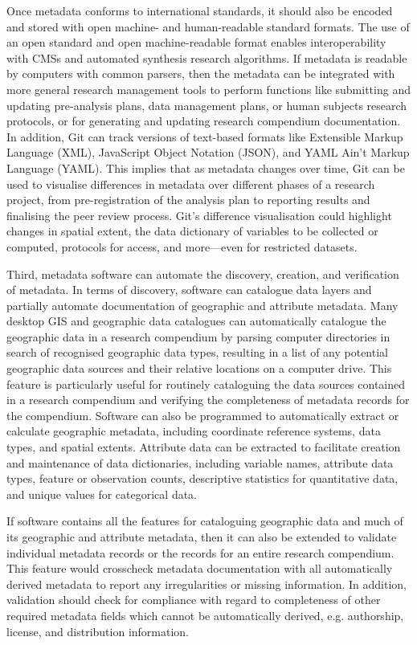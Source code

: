 \documentclass{isprs} %
\begin{document}
Once metadata conforms to international standards, it should also be encoded and stored with open machine- and human-readable standard formats. 
The use of an open standard and open machine-readable format enables interoperability with CMSs and automated synthesis research algorithms.
If metadata is readable by computers with common parsers, then the metadata can be integrated with more general research management tools to perform functions like submitting and updating pre-analysis plans, data management plans, or human subjects research protocols, or for generating and updating research compendium documentation.
In addition, Git can track versions of text-based formats like Extensible Markup Language (XML), JavaScript Object Notation (JSON), and YAML Ain't Markup Language (YAML).
This implies that as metadata changes over time, Git can be used to visualise differences in metadata over different phases of a research project, from pre-registration of the analysis plan to reporting results and finalising the peer review process.
Git's difference visualisation could highlight changes in spatial extent, the data dictionary of variables to be collected or computed, protocols for access, and more---even for restricted datasets.

Third, metadata software can automate the discovery, creation, and verification of metadata.
In terms of discovery, software can catalogue data layers and partially automate documentation of geographic and attribute metadata.
Many desktop GIS and geographic data catalogues can automatically catalogue the geographic data in a research compendium by parsing computer directories in search of recognised geographic data types, resulting in a list of any potential geographic data sources and their relative locations on a computer drive.
This feature is particularly useful for routinely cataloguing the data sources contained in a research compendium and verifying the completeness of metadata records for the compendium.
Software can also be programmed to automatically extract or calculate geographic metadata, including coordinate reference systems, data types, and spatial extents.
Attribute data can be extracted to facilitate creation and maintenance of data dictionaries, including variable names, attribute data types, feature or observation counts, descriptive statistics for quantitative data, and unique values for categorical data.

If software contains all the features for cataloguing geographic data and much of its geographic and attribute metadata, then it can also be extended to validate individual metadata records or the records for an entire research compendium.
This feature would crosscheck metadata documentation with all automatically derived metadata to report any irregularities or missing information.
In addition, validation should check for compliance with regard to completeness of other required metadata fields which cannot be automatically derived, e.g. authorship, license, and distribution information.
\end{document}

